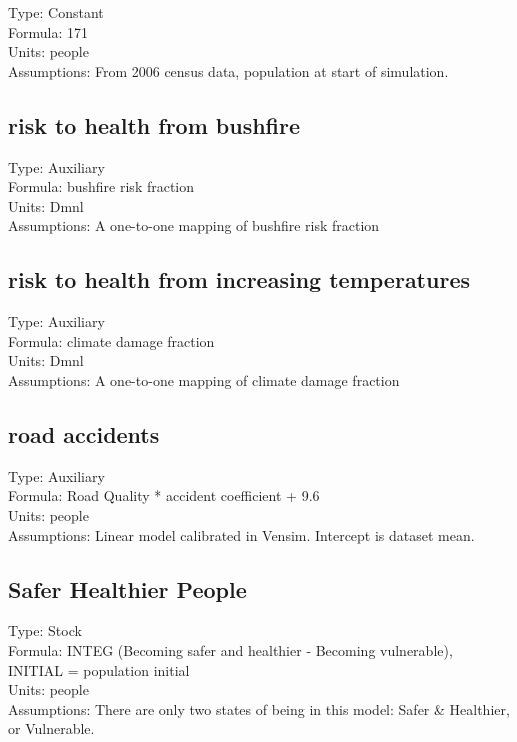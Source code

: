 \documentclass[
  11pt,
]{book}
\begin{document}
Type: Constant\\
Formula: 171\\
Units: people\\
Assumptions: From 2006 census data, population at start of simulation.

\hypertarget{risk-to-health-from-bushfire}{%
\subsection{risk to health from bushfire}\label{risk-to-health-from-bushfire}}

Type: Auxiliary\\
Formula: bushfire risk fraction\\
Units: Dmnl\\
Assumptions: A one-to-one mapping of bushfire risk fraction

\hypertarget{risk-to-health-from-increasing-temperatures}{%
\subsection{risk to health from increasing temperatures}\label{risk-to-health-from-increasing-temperatures}}

Type: Auxiliary\\
Formula: climate damage fraction\\
Units: Dmnl\\
Assumptions: A one-to-one mapping of climate damage fraction

\hypertarget{road-accidents}{%
\subsection{road accidents}\label{road-accidents}}

Type: Auxiliary\\
Formula: Road Quality * accident coefficient + 9.6\\
Units: people\\
Assumptions: Linear model calibrated in Vensim. Intercept is dataset mean.

\hypertarget{safer-healthier-people}{%
\subsection{Safer Healthier People}\label{safer-healthier-people}}

Type: Stock\\
Formula: INTEG (Becoming safer and healthier - Becoming vulnerable), INITIAL = population initial\\
Units: people\\
Assumptions: There are only two states of being in this model: Safer \& Healthier, or Vulnerable.
\end{document}
